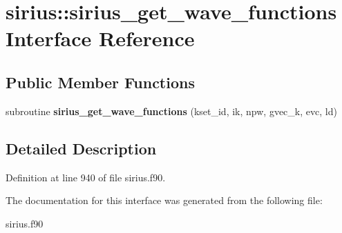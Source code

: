 \hypertarget{interfacesirius_1_1sirius__get__wave__functions}{}\section{sirius\+:\+:sirius\+\_\+get\+\_\+wave\+\_\+functions Interface Reference}
\label{interfacesirius_1_1sirius__get__wave__functions}
\subsection*{Public Member Functions}
\begin{DoxyCompactItemize}
\item 
\hypertarget{interfacesirius_1_1sirius__get__wave__functions_a5c29d26ebaa260bd222bc7c7b95999c0}{}subroutine {\bfseries sirius\+\_\+get\+\_\+wave\+\_\+functions} (kset\+\_\+id, ik, npw, gvec\+\_\+k, evc, ld)\label{interfacesirius_1_1sirius__get__wave__functions_a5c29d26ebaa260bd222bc7c7b95999c0}

\end{DoxyCompactItemize}


\subsection{Detailed Description}


Definition at line 940 of file sirius.\+f90.



The documentation for this interface was generated from the following file\+:\begin{DoxyCompactItemize}
\item 
sirius.\+f90\end{DoxyCompactItemize}
